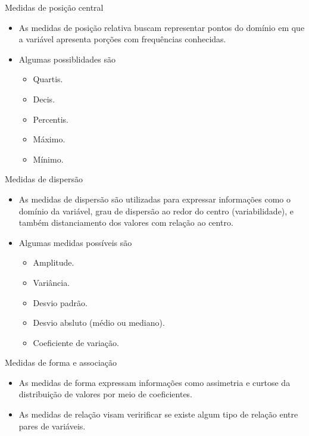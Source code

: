 \documentclass[
  ignorenonframetext,
  serif,
  professionalfont,
  usenames,
  dvipsnames,
  aspectratio = 169]{beamer}
\providecommand{\tightlist}{%
  \setlength{\itemsep}{0pt}\setlength{\parskip}{0pt}}
\renewcommand{\tightlist}{%
  \setlength{\itemsep}{0\baselineskip}
  \setlength{\parskip}{0.25\baselineskip}
}
\begin{document}
\begin{frame}{Medidas de posição central}
\protect\hypertarget{medidas-de-posiuxe7uxe3o-central-1}{}
\begin{itemize}
\item
  As medidas de posição relativa buscam representar pontos do domínio em
  que a variável apresenta porções com frequências conhecidas.
\item
  Algumas possiblidades são

  \begin{itemize}
  \tightlist
  \item
    Quartis.
  \item
    Decis.
  \item
    Percentis.
  \item
    Máximo.
  \item
    Mínimo.
  \end{itemize}
\end{itemize}
\end{frame}

\begin{frame}{Medidas de dispersão}
\protect\hypertarget{medidas-de-dispersuxe3o}{}
\begin{itemize}
\item
  As medidas de dispersão são utilizadas para expressar informações como
  o domínio da variável, grau de dispersão ao redor do centro
  (variabilidade), e também distanciamento dos valores com relação ao
  centro.
\item
  Algumas medidas possíveis são

  \begin{itemize}
  \tightlist
  \item
    Amplitude.
  \item
    Variância.
  \item
    Desvio padrão.
  \item
    Desvio absluto (médio ou mediano).
  \item
    Coeficiente de variação.
  \end{itemize}
\end{itemize}
\end{frame}

\begin{frame}{Medidas de forma e associação}
\protect\hypertarget{medidas-de-forma-e-associauxe7uxe3o}{}
\begin{itemize}
\item
  As medidas de forma expressam informações como assimetria e curtose da
  distribuição de valores por meio de coeficientes.
\item
  As medidas de relação visam veririficar se existe algum tipo de
  relação entre pares de variáveis.
\end{itemize}
\end{frame}
\end{document}
